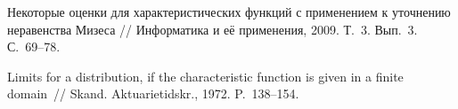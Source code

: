 \begin{multicols}{2}
{{\begin{thebibliography}{99}
 Некоторые оценки для характеристических функций
с применением к уточнению неравенства Мизеса // Информатика и её применения, 2009.
Т.~3. Вып.~3. С.~69--78.

\label{end\stat}

 Limits for a distribution, if the characteristic
function is given in a finite domain~// Skand. Aktuarietidskr.,
1972. P.~138--154.





 \end{thebibliography}
}
}
\end{multicols}